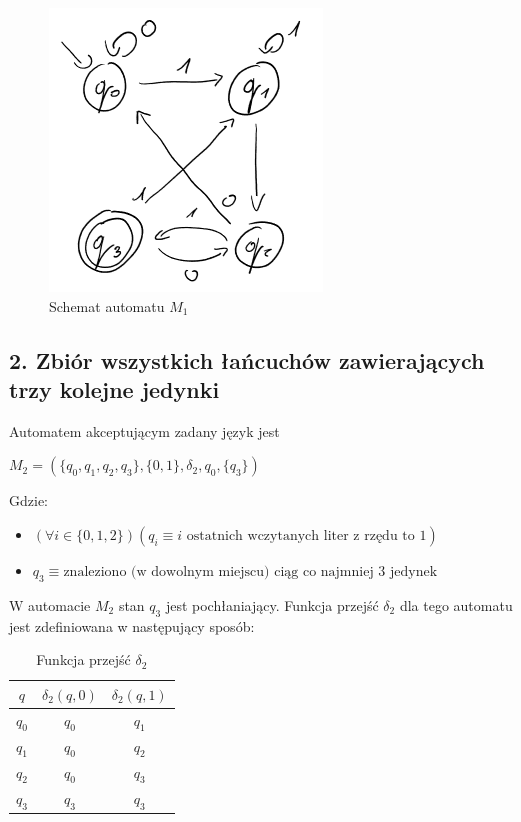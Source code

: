 \documentclass[12pt]{article}
\begin{document}
    \noindent
    \begin{figure}[h]
        \centering
        \includegraphics[width=0.5\linewidth]{img/m1.png}
        \caption{Schemat automatu $M_1$}
        \label{fig:m1}
    \end{figure}

\newpage

\subsection*{2. Zbiór wszystkich łańcuchów zawierających trzy kolejne jedynki}
    Automatem akceptującym zadany język jest
    \begin{center}
    \begin{math}
        M_2 = (\{q_0, q_1, q_2, q_3\}, \{0, 1\}, \delta_2, q_0, \{q_3\})
    \end{math}
    \end{center}

    \noindent Gdzie:
    \begin{itemize}
        \item $(\forall i \in \{0, 1, 2\})(q_i \equiv i \text{ ostatnich wczytanych liter z rzędu to } 1)$
        \item $q_3 \equiv \text{znaleziono (w dowolnym miejscu) ciąg co najmniej 3 jedynek}$
    \end{itemize}

    \noindent W automacie $M_2$ stan $q_3$ jest pochłaniający.
    \newline\newline
    Funkcja przejść $\delta_2$ dla tego automatu jest zdefiniowana w następujący sposób:

    \begin{table}[h!]
        \centering
        \begin{tabularx}{0.255\textwidth}{| c | c | c |}
            \hline
            $q$ & $\delta_2(q, 0)$ & $\delta_2(q, 1)$ \\
            \hline
            $q_0$ & $q_0$ & $q_1$ \\
            $q_1$ & $q_0$ & $q_2$ \\
            $q_2$ & $q_0$ & $q_3$ \\
            $q_3$ & $q_3$ & $q_3$ \\
            \hline
        \end{tabularx}
        \caption{Funkcja przejść $\delta_2$}
        \label{table:delta_2}
    \end{table}
\end{document}
